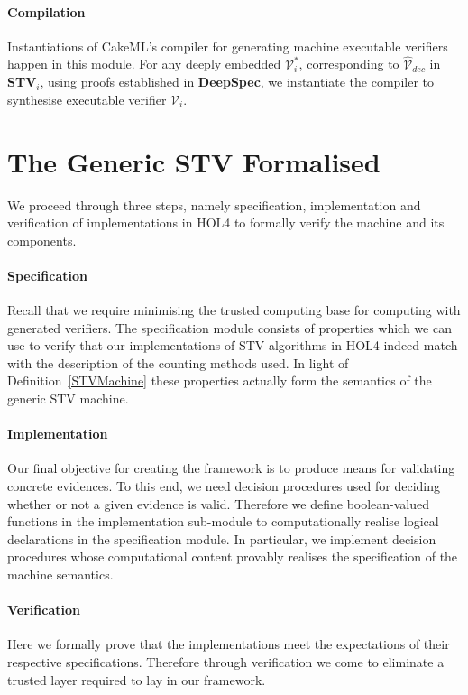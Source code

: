 \documentclass[10pt,conference]{IEEEtran}
\begin{document}
\paragraph*{\textbf{Compilation}} 
Instantiations of CakeML's  compiler for generating machine executable verifiers happen in this module. For any deeply embedded $\mathcal{V}^{*}_{i}$, corresponding to $\hat{\mathcal{V}}_{dec}$ in \textbf{STV}$_{i}$, using proofs  established in \textbf{DeepSpec}, we instantiate the compiler to synthesise executable  verifier $\mathcal{V}_{i}$.  
\section{The Generic STV Formalised}\label{sec:GenCertVer}
We proceed through three steps, namely specification, implementation and verification of implementations in HOL4 to formally verify the machine and its components.
\paragraph*{Specification}  
Recall that we require minimising the trusted computing base  for computing with generated verifiers. The specification module consists of properties which we can use to verify that our implementations of  STV algorithms in HOL4 indeed match with the description of the counting methods used.  
 In light of Definition~\ref{STVMachine} these properties   actually form the semantics of the generic STV machine.   
\paragraph*{Implementation} Our final objective for creating the framework is to produce means for validating concrete evidences. To this end, we need decision procedures used for deciding whether or not a given evidence is valid. Therefore we define boolean-valued functions in the implementation sub-module to computationally realise logical declarations in the specification module. In particular, we implement decision procedures whose computational content  provably realises the specification of the machine semantics.  
\paragraph*{Verification} Here we formally prove that the implementations meet the expectations of their respective specifications. Therefore through verification we come to eliminate a trusted layer  required to lay in our framework.  
\end{document}
